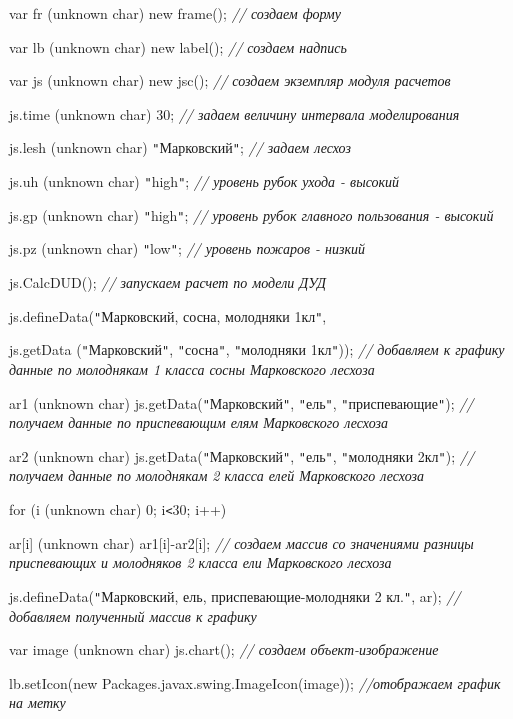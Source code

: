 \documentclass{article}
\begin{document}
var fr (unknown char) new frame();     \textit{// создаем форму}

var lb (unknown char) new label();     \textit{// создаем надпись}

var js (unknown char) new jsc();        \textit{// создаем экземпляр 
модуля расчетов}

js.time (unknown char) 30;       \textit{// задаем величину интервала 
моделирования}

js.lesh (unknown char) \texttt{"}Марковский\texttt{"};     \textit{// 
задаем лесхоз}

js.uh (unknown char) \texttt{"}high\texttt{"};   \textit{// уровень рубок 
ухода - высокий}

js.gp (unknown char) \texttt{"}high\texttt{"};  \textit{// уровень рубок 
главного пользования - высокий}

js.pz (unknown char) \texttt{"}low\texttt{"};      \textit{// уровень пожаров 
- низкий }

js.CalcDUD();      \textit{// запускаем расчет по модели 
ДУД}

js.defineData(\texttt{"}Марковский, сосна, молодняки 1кл\texttt{"}, 

js.getData (\texttt{"}Марковский\texttt{"}, \texttt{"}сосна\texttt{"}, 
\texttt{"}молодняки 1кл\texttt{"}));   \textit{// добавляем 
к графику данные по молоднякам 1 класса сосны 
Марковского лесхоза}

ar1 (unknown char) js.getData(\texttt{"}Марковский\texttt{"}, \texttt{"}ель\texttt{"}, 
\texttt{"}приспевающие\texttt{"});  \textit{// получаем данные 
по приспевающим елям Марковского лесхоза}

ar2 (unknown char) js.getData(\texttt{"}Марковский\texttt{"}, \texttt{"}ель\texttt{"}, 
\texttt{"}молодняки 2кл\texttt{"});  \textit{// получаем данные 
по молоднякам 2 класса елей Марковского лесхоза}

for (i (unknown char) 0; i\texttt{<}30; i++)           

ar[i] (unknown char) ar1[i]-ar2[i];    \textit{// создаем массив со 
значениями разницы приспевающих и молодняков 
2 класса ели Марковского лесхоза}

js.defineData(\texttt{"}Марковский, ель, приспевающие-молодняки 
2 кл.\texttt{"}, ar);       \textit{// добавляем полученный 
массив к графику}

var image (unknown char) js.chart();    \textit{// создаем объект-изображение}

lb.setIcon(new Packages.javax.swing.ImageIcon(image));  \textit{//отображаем 
график на метку}
\end{document}
